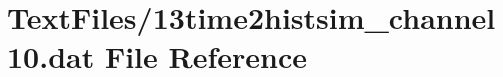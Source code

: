 \hypertarget{13time2histsim__channel10_8dat}{}\section{Text\+Files/13time2histsim\+\_\+channel10.dat File Reference}
\label{13time2histsim__channel10_8dat}
